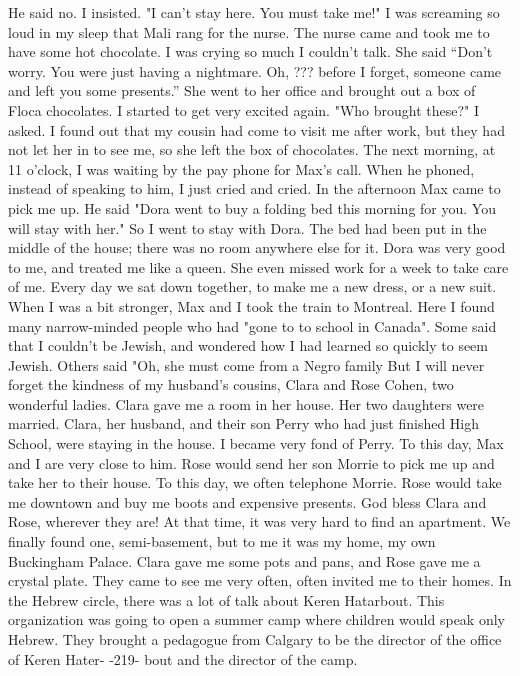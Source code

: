He said no.
I insisted.
"I can't stay here.
You must take me!"
I was screaming so loud in my sleep that Mali 
rang for the nurse.
The nurse came and took me to have some hot chocolate.
I was crying so much I couldn’t talk.
She said “Don’t worry.
You were just having a nightmare.
Oh, ???
before I forget, someone came and left you some presents.”
She went to her office and brought out a box of Floca chocolates.
I started to 
get very excited again.
"Who brought these?"
I asked.
I found out that my cousin 
had come to visit me after work, but they had not let her in to see me, so she left 
the box of chocolates.
The next morning, at 11 o'clock, I was waiting by the pay phone for Max's call.
When he phoned, instead of speaking to him, I just cried and cried.
In the afternoon 
Max came to pick me up.
He said "Dora went to buy a folding bed this morning for you.
You will stay with her."
So I went to stay with Dora.
The bed had been put in the middle of the house; 
there was no room anywhere else for it.
Dora was very good to me, and treated me like 
a queen.
She even missed work for a week to take care of me.
Every day we sat down
together, to make me a new dress, or a new suit.
When I was a bit stronger, Max and 
I took the train to Montreal.
Here I found many narrow-minded people who had "gone to 
to school in Canada".
Some said that I couldn't be Jewish, and wondered how I had 
learned so quickly to seem Jewish.
Others said "Oh, she must come from a Negro family 
But I will never forget the kindness of my husband's cousins, Clara and Rose Cohen, two 
wonderful ladies.
Clara gave me a room in her house.
Her two daughters were married.
Clara, her
husband, and their son Perry who had just finished High School, were staying in the 
house.
I became very fond of Perry.
To this day, Max and I are very close to him.
Rose would send her son Morrie to pick me up and take her to their house.
To this 
day, we often telephone Morrie.
Rose would take me downtown and buy me boots and 
expensive presents.
God bless Clara and Rose, wherever they are!
At that time, it was very hard to find an apartment.
We finally found one, 
semi-basement, but to me it was my home, my own Buckingham Palace.
Clara gave me some 
pots and pans, and Rose gave me a crystal plate.
They came to see me very often, 
often invited me to their homes.
In the Hebrew circle, there was a lot of talk about Keren Hatarbout.
This organization was going to open a summer camp where children would speak only Hebrew.
They
brought a pedagogue from Calgary to be the director of the office of Keren Hater-
-219- 
bout and the director of the camp.
